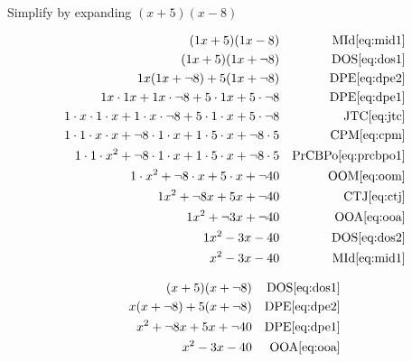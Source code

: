 \documentclass[20150903-160354-rs2.2-MarksMathNotebook.tex]{subfiles}
\begin{document}
\begin{example}[id:20141109-133008] \label{20141109-133008}   \hfill \\

Simplify by expanding $(x+5)(x-8)$

\soln

\solnsteps
\begin{align*}
(1x+5)(1x-8)  && \text{MId} \eqref{eq:mid1} \\
(1x+5)(1x+\neg 8)  && \text{DOS} \eqref{eq:dos1} \\
1x(1x+\neg 8) + 5(1x+\neg 8) && \text{DPE} \eqref{eq:dpe2} \\
1x \cdot 1x + 1x \cdot \neg 8 + 5 \cdot 1x + 5 \cdot \neg 8 && \text{DPE} \eqref{eq:dpe1} \\
1 \cdot x \cdot 1 \cdot x + 1 \cdot x \cdot \neg 8 + 5 \cdot 1 \cdot x + 5 \cdot \neg 8 && \text{JTC} \eqref{eq:jtc} \\
1 \cdot 1 \cdot x \cdot x + \neg 8 \cdot 1 \cdot x + 1 \cdot 5 \cdot x + \neg 8 \cdot 5  && \text{CPM} \eqref{eq:cpm} \\
1 \cdot 1 \cdot x^2 + \neg 8 \cdot 1 \cdot x + 1 \cdot 5 \cdot x + \neg 8 \cdot 5 && \text{PrCBPo} \eqref{eq:prcbpo1} \\
1 \cdot x^2 + \neg 8 \cdot x + 5 \cdot x  + \neg 40  && \text{OOM} \eqref{eq:oom} \\
1  x^2 +  \neg 8 x +5x + \neg 40  && \text{CTJ} \eqref{eq:ctj} \\
1 x^2 + \neg 3 x + \neg 40  && \text{OOA} \eqref{eq:ooa} \\
1 x^2 - 3x - 40  && \text{DOS} \eqref{eq:dos2} \\
x^2-3x-40  && \text{MId} \eqref{eq:mid1}
\end{align*}

\soln

\lesssteps
\begin{align*}
(x+5)(x+\neg 8) && \text{DOS} \eqref{eq:dos1} \\
x(x+\neg 8)+ 5(x+\neg 8) && \text{DPE} \eqref{eq:dpe2} \\
x^2 + \neg 8x + 5x + \neg 40 && \text{DPE} \eqref{eq:dpe1} \\
x^2-3x-40 && \text{OOA} \eqref{eq:ooa}
\end{align*}

\end{example}
\end{document}
